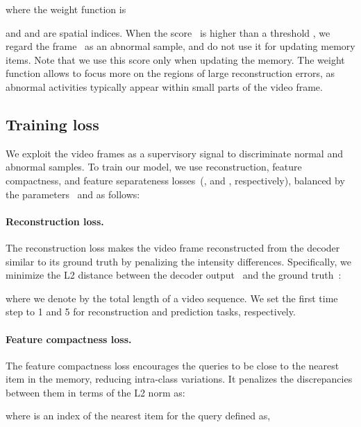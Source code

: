 \documentclass[10pt,twocolumn,letterpaper]{article}
\begin{document}
	where the weight function  is
			
and  and  are spatial indices. When the score~ is higher than a threshold , we regard the frame~ as an abnormal sample, and do not use it for updating memory items. Note that we use this score only when updating the memory. The weight function allows to focus more on the regions of large reconstruction errors, as abnormal activities typically appear within small parts of the video frame.



		\vspace{-0.1cm}
	\subsection{Training loss} \label{sec:loss}
\vspace{-0.1cm}
		We exploit the video frames as a supervisory signal to discriminate normal and abnormal samples. To train our model, we use reconstruction, feature compactness, and feature separateness losses~(,  and , respectively), balanced by the parameters~ and  as follows:
		


\vspace{-0.3cm}
		\paragraph{Reconstruction loss.}
			The reconstruction loss makes the video frame reconstructed from the decoder similar to its ground truth by penalizing the intensity differences. Specifically, we minimize the L2 distance between the decoder output~ and the ground truth~:
			
			where we denote  by the total length of a video sequence. We set the first time step to 1 and 5 for reconstruction and prediction tasks, respectively.
			
\vspace{-0.4cm}		
		\paragraph{Feature compactness loss.}
The feature compactness loss encourages the queries to be close to the nearest item in the memory, reducing intra-class variations. It penalizes the discrepancies between them in terms of the L2 norm as:
			
			where  is an index of the nearest item for the query  defined as, 
			
\end{document}

